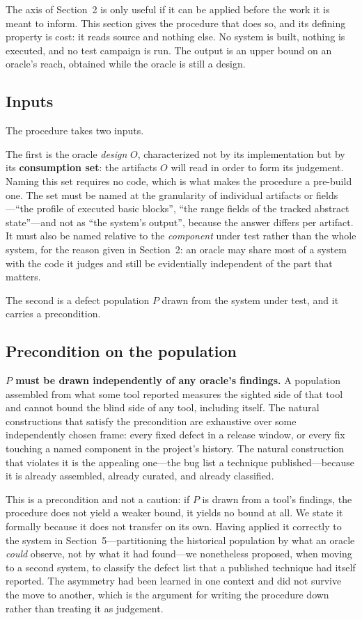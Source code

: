 The axis of Section~2 is only useful if it can be applied before the work it is
meant to inform. This section gives the procedure that does so, and its defining
property is cost: it reads source and nothing else. No system is built, nothing is
executed, and no test campaign is run. The output is an upper bound on an oracle's
reach, obtained while the oracle is still a design.

\subsection{Inputs}

The procedure takes two inputs.

The first is the oracle \emph{design} $O$, characterized not by its implementation
but by its \textbf{consumption set}: the artifacts $O$ will read in order to form
its judgement. Naming this set requires no code, which is what makes the procedure
a pre-build one. The set must be named at the granularity of individual artifacts
or fields---``the profile of executed basic blocks'', ``the range fields of the
tracked abstract state''---and not as ``the system's output'', because the answer
differs per artifact. It must also be named relative to the \emph{component} under
test rather than the whole system, for the reason given in Section~2: an oracle may
share most of a system with the code it judges and still be evidentially
independent of the part that matters.

The second is a defect population $P$ drawn from the system under test, and it
carries a precondition.

\subsection{Precondition on the population}

\textbf{$P$ must be drawn independently of any oracle's findings.} A population
assembled from what some tool reported measures the sighted side of that tool and
cannot bound the blind side of any tool, including itself. The natural constructions
that satisfy the precondition are exhaustive over some independently chosen frame:
every fixed defect in a release window, or every fix touching a named component in
the project's history. The natural construction that violates it is the appealing
one---the bug list a technique published---because it is already assembled,
already curated, and already classified.

This is a precondition and not a caution: if $P$ is drawn from a tool's findings,
the procedure does not yield a weaker bound, it yields no bound at all. We state it
formally because it does not transfer on its own. Having applied it correctly to the
system in Section~5---partitioning the historical population by what an oracle
\emph{could} observe, not by what it had found---we nonetheless proposed, when
moving to a second system, to classify the defect list that a published technique
had itself reported. The asymmetry had been learned in one context and did not
survive the move to another, which is the argument for writing the procedure down
rather than treating it as judgement.

